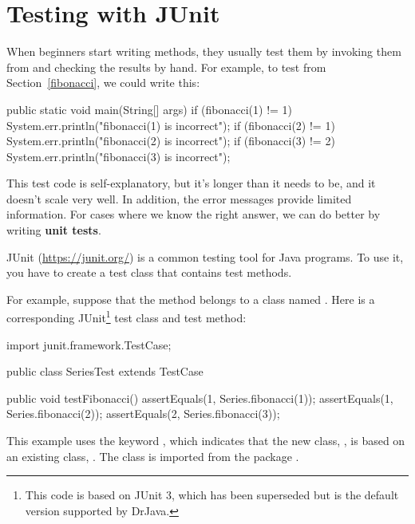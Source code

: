 \section{Testing with JUnit}
\label{tools_testing-with-junit}


When beginners start writing methods, they usually test them by invoking them from  and checking the results by hand.
For example, to test  from Section~\ref{fibonacci}, we could write this:

\begin{code}
public static void main(String[] args) {
    if (fibonacci(1) != 1) {
        System.err.println("fibonacci(1) is incorrect");
    }
    if (fibonacci(2) != 1) {
        System.err.println("fibonacci(2) is incorrect");
    }
    if (fibonacci(3) != 2) {
        System.err.println("fibonacci(3) is incorrect");
    }
}
\end{code}

This test code is self-explanatory, but it's longer than it needs to be, and it doesn't scale very well.
In addition, the error messages provide limited information.
For cases where we know the right answer, we can do better by writing {\bf unit tests}.


JUnit (\url{https://junit.org/}) is a common testing tool for Java programs.
To use it, you have to create a test class that contains test methods.

For example, suppose that the  method belongs to a class named .
Here is a corresponding JUnit\footnote{This code is based on JUnit 3, which has been superseded but is the default version supported by DrJava.} test class and test method:

\begin{code}
import junit.framework.TestCase;

public class SeriesTest extends TestCase {

    public void testFibonacci() {
        assertEquals(1, Series.fibonacci(1));
        assertEquals(1, Series.fibonacci(2));
        assertEquals(2, Series.fibonacci(3));
    }
}
\end{code}

This example uses the keyword , which indicates that the new class, , is based on an existing class, .
The  class is imported from the package .

